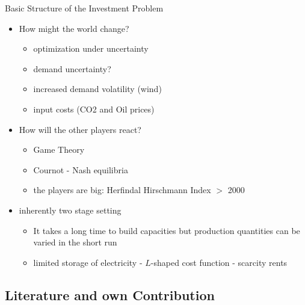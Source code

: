 \begin{frame}{Basic Structure of the Investment Problem}

\begin{itemize}
	\item How might the world change?
\begin{itemize}
  \item optimization under uncertainty
	\item demand uncertainty?
	\item increased demand volatility (wind)
	\item input costs (CO2 and Oil prices)
\end{itemize}

  \item How will the other players react?
  
\begin{itemize}
	\item Game Theory
	\item Cournot - Nash equilibria
	\item the players are big: Herfindal Hirschmann Index $>$ 2000
\end{itemize}
\end{itemize}

\begin{itemize}
	\item inherently two stage setting
	
\begin{itemize}
	\item It takes a long time to build capacities but production quantities can be varied in the short run
	\item limited storage of electricity - $L$-shaped cost function - scarcity rents
\end{itemize}
\end{itemize}

\end{frame}
\subsection{Literature and own Contribution}


